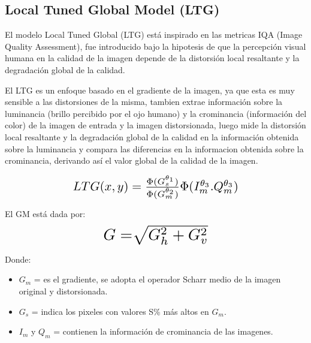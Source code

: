 \documentclass[spanish,twocolumn]{article}
\begin{document}
\subsection{ Local Tuned Global Model (LTG)}
\label{ssec:ltg}
El modelo {Local Tuned Global (LTG)} está inspirado en las metricas IQA (Image Quality Assessment)\cite{ltg2014}, fue introducido bajo la hipotesis de que la percepción visual humana en  la calidad de la imagen depende de la distorsión local resaltante y la degradación global de la calidad. %

El LTG es un enfoque basado en el gradiente de la imagen, ya que esta es muy sensible a las distorsiones de la misma, tambien extrae información sobre la luminancia (brillo percibido por el ojo humano) y la crominancia (información del color) de la imagen de entrada y la imagen distorsionada, luego mide la distorsión local resaltante y la degradación global de la calidad en la información obtenida sobre la luminancia y compara las diferencias en la informacion obtenida sobre la crominancia, derivando así el valor global de la calidad de la imagen.

\begin{equation}\label{eq:ltg}
\resizebox{.6\hsize}{!}
{
$LTG(x,y) =\frac{\Phi(G_{s}^{\theta_1})}{\Phi(G_{m}^{\theta_2})} \Phi(I_{m}^{\theta_3}.Q_{m}^{\theta_3})$
}
\end{equation}

El GM está dada por:
\begin{equation}\label{eq:gm}
\resizebox{.4\hsize}{!}
{
$G = \sqrt[]{G_{h}^{2} + G_{v}^{2}}$
}
\end{equation}

Donde:
\begin{itemize}
 \item $G_{m}$ =  es el gradiente, se adopta el operador Scharr  \cite{gradiente} 
  medio de la imagen original y distorsionada.
 \item $ G_{s}$ = indica los pixeles con valores S\% más altos en $G_{m}$.
 \item  $I_{m}$ y $Q_{m}$ = contienen la información de crominancia de las imagenes. 
\end{itemize} 

\end{document}
